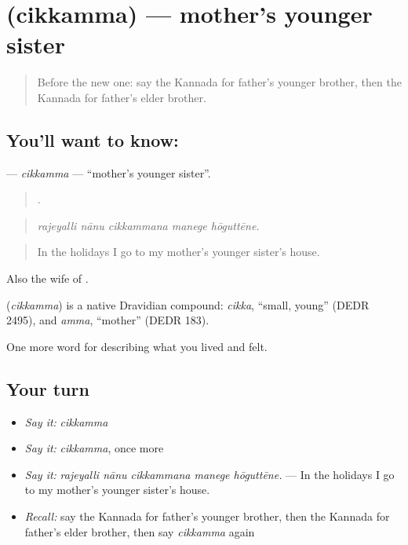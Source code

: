 \section[\texorpdfstring{\kn{ಚಿಕ್ಕಮ್ಮ} (cikkamma)}{ಚಿಕ್ಕಮ್ಮ (cikkamma)}]{ (cikkamma) — mother's younger sister}

\label{lesson:KA-C524-cikkamma}



\begin{quote}
Before the new one: say the Kannada for father's younger brother, then the Kannada for father's elder brother.
\end{quote}

\subsection*{You'll want to know: }
\textbf{} — \emph{cikkamma} — \textquotedblleft{}mother's younger sister\textquotedblright{}.

\begin{quote}
    .
\end{quote}

\begin{quote}
\emph{rajeyalli nānu cikkammana manege hōguttēne.}
\end{quote}

\begin{quote}
In the holidays I go to my mother's younger sister's house.
\end{quote}

Also the wife of .

\begin{cousinweb}
\textbf{} (\emph{cikkamma}) is a native Dravidian compound: \emph{cikka}, \textquotedblleft{}small, young\textquotedblright{} (DEDR 2495), and \emph{amma}, \textquotedblleft{}mother\textquotedblright{} (DEDR 183).
\end{cousinweb}

\begin{grammarlens}[title={What you've built}]
One more word for describing what you lived and felt.
\end{grammarlens}

\subsection*{Your turn}
\begin{itemize}
\raggedright
  \item \emph{Say it:} \emph{cikkamma}
  \item \emph{Say it:} \emph{cikkamma}, once more
  \item \emph{Say it:} \emph{rajeyalli nānu cikkammana manege hōguttēne.} — In the holidays I go to my mother's younger sister's house.
  \item \emph{Recall:} say the Kannada for father's younger brother, then the Kannada for father's elder brother, then say \emph{cikkamma} again
\end{itemize}

